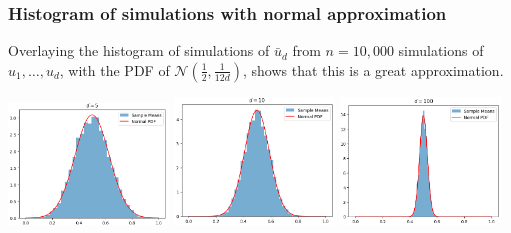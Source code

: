 \documentclass[aspectratio=169,xcolor=dvipsnames]{beamer}
\begin{document}
    \begin{frame}
    \frametitle{Histogram of simulations with normal approximation}

        Overlaying the histogram of simulations of \( \bar{u}_d \) from \( n = 10,000 \) simulations of \( u_1, \dots, u_d \), with the PDF of \( \mathcal{N}\left( \frac{1}{2}, \frac{1}{12d} \right) \), shows that this is a great approximation.
    
        \begin{center}
            \includegraphics[width=0.32\textwidth]{mc1.PNG}
            \includegraphics[width=0.32\textwidth]{mc2.PNG}
            \includegraphics[width=0.32\textwidth]{mc3.PNG}
        \end{center}

    \end{frame}
\end{document}
